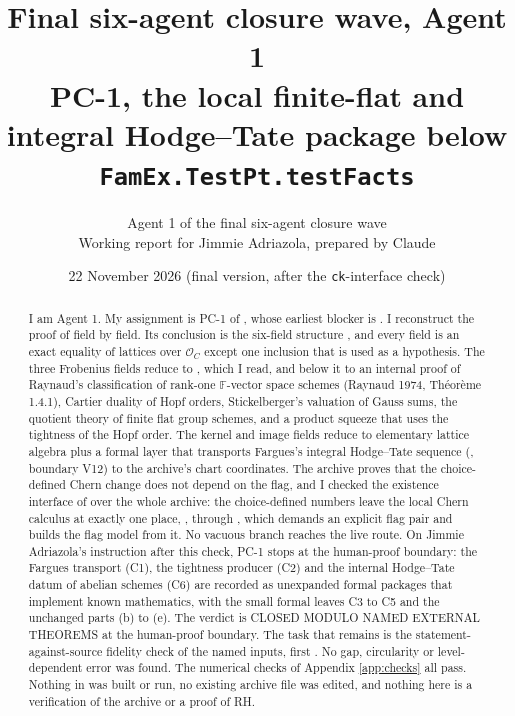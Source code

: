 \documentclass[11pt]{article}
\title{Final six-agent closure wave, Agent 1\\ PC-1, the local finite-flat and integral Hodge--Tate package below \texttt{FamEx.TestPt.testFacts}}
\author{Agent 1 of the final six-agent closure wave\\ Working report for Jimmie Adriazola, prepared by Claude}
\date{22 November 2026 (final version, after the \texttt{ck}-interface check)}
\newcommand{\cO}{\mathcal O}
\newcommand{\Fq}{\mathbb F}
\theoremstyle{remark}
\begin{document}
\maketitle

\begin{abstract}
I am Agent 1. My assignment is PC-1 of , whose earliest blocker is . I reconstruct the proof of  field by field. Its conclusion is the six-field structure , and every field is an exact equality of lattices over $\cO_C$ except one inclusion that is used as a hypothesis. The three Frobenius fields reduce to , which I read, and below it to an internal proof of Raynaud's classification of rank-one $\Fq$-vector space schemes (Raynaud 1974, Th\'eor\`eme 1.4.1), Cartier duality of Hopf orders, Stickelberger's valuation of Gauss sums, the quotient theory of finite flat group schemes, and a product squeeze that uses the tightness of the Hopf order. The kernel and image fields reduce to elementary lattice algebra plus a formal layer that transports Fargues's integral Hodge--Tate sequence (, boundary V12) to the archive's chart coordinates. The archive proves that the choice-defined Chern change  does not depend on the flag, and I checked the existence interface of  over the whole archive: the choice-defined numbers leave the local Chern calculus at exactly one place, , through , which demands an explicit flag pair and builds the flag model from it. No vacuous branch reaches the live route. On Jimmie Adriazola's instruction after this check, PC-1 stops at the human-proof boundary: the Fargues transport (C1), the tightness producer (C2) and the internal Hodge--Tate datum of abelian schemes (C6) are recorded as unexpanded formal packages that implement known mathematics, with the small formal leaves C3 to C5 and the unchanged parts (b) to (e). The verdict is CLOSED MODULO NAMED EXTERNAL THEOREMS at the human-proof boundary. The task that remains is the statement-against-source fidelity check of the named inputs, first . No gap, circularity or level-dependent error was found. The numerical checks of Appendix \ref{app:checks} all pass. Nothing in  was built or run, no existing archive file was edited, and nothing here is a verification of the archive or a proof of RH.
\end{abstract}
\end{document}
